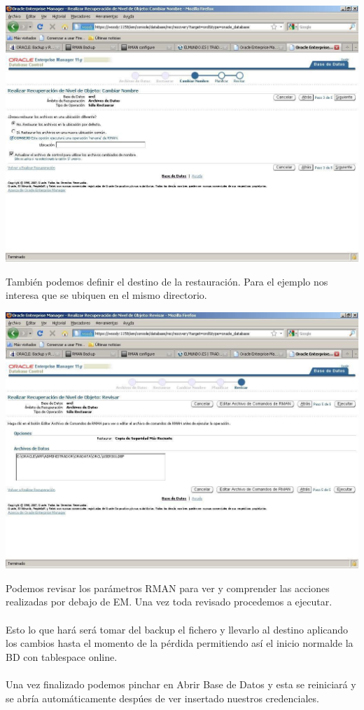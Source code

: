 \documentclass[12pt,letterpaper]{article}
\begin{document}
{\includegraphics[width=20cm]{./IMG/img35.png}

\begin{enumerate}
También podemos definir el destino de la restauración. Para el ejemplo nos interesa que se ubiquen en el mismo directorio. \\
\end{enumerate}

\newpage

\includegraphics[width=20cm]{./IMG/img36.png}
\begin{enumerate}
Podemos revisar los parámetros RMAN para ver y comprender las acciones realizadas por debajo de EM. Una vez toda revisado procedemos a ejecutar. \\
\\
Esto lo que hará será tomar del backup el fichero y llevarlo al destino aplicando los cambios hasta el momento de la pérdida permitiendo así el inicio normalde la BD con tablespace online. \\
\\
Una vez finalizado podemos pinchar en Abrir Base de Datos y esta se reiniciará y se abría automáticamente despúes de ver insertado nuestros credenciales. \\
\\
\end{enumerate}

}
\end{document}
